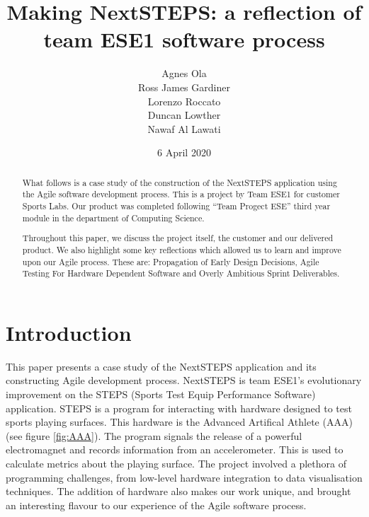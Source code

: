 \documentclass{l3proj}
\begin{document}
\title{Making NextSTEPS: a reflection of team ESE1 software process}

\author{Agnes Ola \\
        Ross James Gardiner \\
        Lorenzo Roccato \\
        Duncan Lowther \\
        Nawaf Al Lawati}

\date{6 April 2020}

\maketitle

\begin{abstract}

What follows is a case study of the construction of the NextSTEPS application using the Agile software development process. This is a project by Team ESE1 for customer Sports Labs. Our product was completed following ``Team Progect ESE'' third year module in the department of Computing Science. 

Throughout this paper, we discuss the project itself, the customer and our delivered product. We also highlight some key reflections which allowed us to learn and improve upon our Agile process. These are: Propagation of Early Design Decisions, Agile Testing For Hardware Dependent Software and Overly Ambitious Sprint Deliverables.

\end{abstract}

\educationalconsent

\newpage
\section{Introduction}

This paper presents a case study of the NextSTEPS application and its constructing Agile development process. NextSTEPS is team ESE1's evolutionary improvement on the STEPS (Sports Test Equip Performance Software) application. STEPS is a program for interacting with hardware designed to test sports playing surfaces. This hardware is the Advanced Artifical Athlete (AAA) (see figure \ref{fig:AAA}). The program signals the release of a powerful electromagnet and records information from an accelerometer. This is used to calculate metrics about the playing surface. The project involved a plethora of programming challenges, from low-level hardware integration to data visualisation techniques. The addition of hardware also makes our work unique, and brought an interesting flavour to our experience of the Agile software process. 
\end{document}
